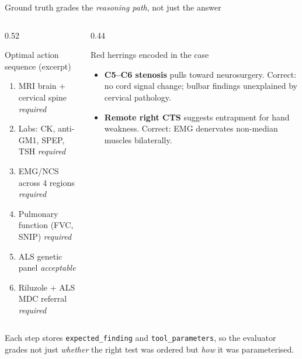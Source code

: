 \documentclass[aspectratio=169,t]{beamer}
\begin{document}
\begin{frame}{Ground truth grades the \emph{reasoning path}, not just the answer}
  \footnotesize
  \begin{columns}[T,onlytextwidth]
    \begin{column}{0.52\textwidth}
      \begin{block}{Optimal action sequence (excerpt)}
        \scriptsize
        \begin{enumerate}\setlength\itemsep{0em}
          \item MRI brain + cervical spine  \hfill\emph{required}
          \item Labs: CK, anti-GM1, SPEP, TSH \hfill\emph{required}
          \item EMG/NCS across 4 regions    \hfill\emph{required}
          \item Pulmonary function (FVC, SNIP) \hfill\emph{required}
          \item ALS genetic panel \hfill\emph{acceptable}
          \item Riluzole + ALS MDC referral \hfill\emph{required}
        \end{enumerate}
      \end{block}
    \end{column}%
    \hfill
    \begin{column}{0.44\textwidth}
      \begin{alertblock}{Red herrings encoded in the case}
        \scriptsize
        \begin{itemize}\setlength\itemsep{0em}
          \item \textbf{C5--C6 stenosis} pulls toward neurosurgery.
                Correct: no cord signal change; bulbar findings
                unexplained by cervical pathology.
          \item \textbf{Remote right CTS} suggests entrapment for
                hand weakness. Correct: EMG denervates non-median
                muscles bilaterally.
        \end{itemize}
      \end{alertblock}
    \end{column}
  \end{columns}

  \vspace{0.5mm}
  \scriptsize
  Each step stores \texttt{expected\_finding} and
  \texttt{tool\_parameters}, so the evaluator grades not just
  \emph{whether} the right test was ordered but \emph{how} it was
  parameterised.
\end{frame}
\end{document}
